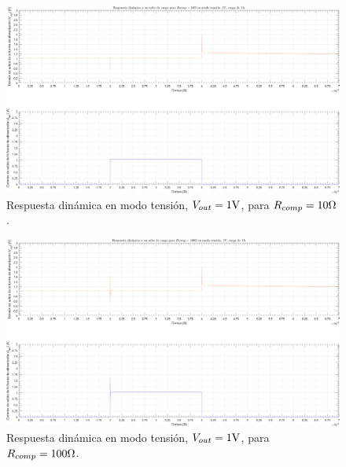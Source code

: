 \clearpage

\begin{figure}[H] %
\begin{center}
\includegraphics[width=1.1 \textwidth, angle=90]{./img/plots/dynamic/power_supply_RCOMP_10_STEP_Modo2.png}
\caption{\label{fig:fig_power_supply_RCOMP_STEP_10n_Modo2}\footnotesize{Respuesta dinámica en modo tensión, $V_{out} = 1 \si[per-mode=symbol]{\volt}$, para $R_{comp} = 10 \si[per-mode=symbol]{\ohm} $.}}
\end{center}
\end{figure}

\clearpage

\begin{figure}[H] %
\begin{center}
\includegraphics[width=1.1 \textwidth, angle=90]{./img/plots/dynamic/power_supply_RCOMP_100_STEP_Modo2.png}
\caption{\label{fig:fig_power_supply_RCOMP_STEP_20n_Modo2}\footnotesize{Respuesta dinámica en modo tensión, $V_{out} = 1 \si[per-mode=symbol]{\volt}$, para $R_{comp} = 100 \si[per-mode=symbol]{\ohm} $.}}
\end{center}
\end{figure}

